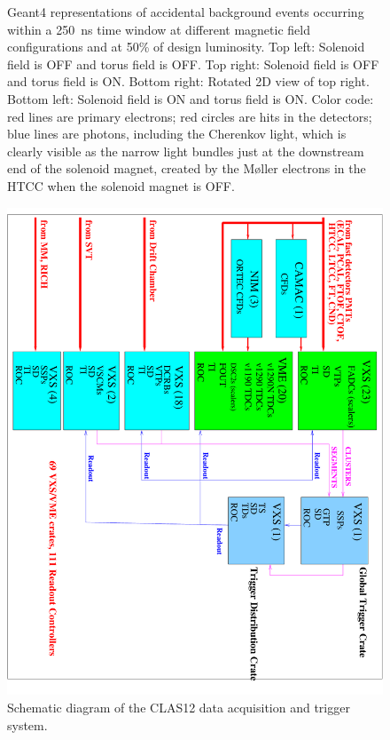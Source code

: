 \documentclass[final,3p]{elsarticle}
\begin{document}
\begin{twocolumn}
\begin{figure}[htbp!]
\caption{Geant4 representations of accidental background events occurring within a 250~ns time window at different
  magnetic field configurations and at 50\% of design luminosity. Top left: Solenoid field is OFF and torus field is OFF.
  Top right: Solenoid field is OFF and torus field is ON. Bottom right: Rotated 2D view of top right. Bottom left: Solenoid
  field is ON and torus field is ON. Color code: red lines are primary electrons; red circles are hits in the detectors; blue
  lines are photons, including the Cherenkov light, which is clearly visible as the narrow light bundles just at the
  downstream end of the solenoid magnet, created by the M{\o}ller electrons in the HTCC when the solenoid magnet is
  OFF.}
  \label{gemc-event}
\end{figure}

\begin{figure}[htbp!]
\centerline{\includegraphics[angle=90,width=1.5\columnwidth]{clas12-daq-1.pdf}}
\caption{Schematic diagram of the CLAS12 data acquisition and trigger system.}
\label{daq}
\end{figure}


\end{twocolumn}
\end{document}
